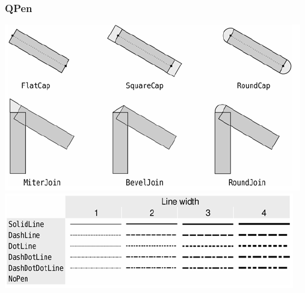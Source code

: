     \begin{minipage}{0.6\linewidth}
        \subsubsection{QPen}
        \includegraphics[width=\linewidth]{images/pen_1.png}\newline \includegraphics[width=\linewidth]{images/pen_2.png}\newline   
    \end{minipage}
\clearpage

